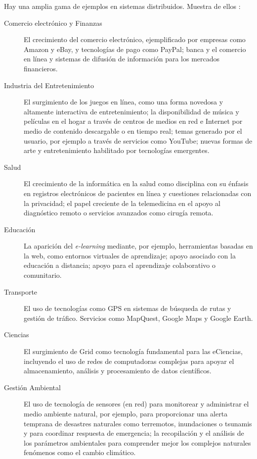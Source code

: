Hay una amplia gama de ejemplos en sistemas distribuidos. Muestra de ellos \cite{Coulouris2011}: 
\begin{description}
	\item[{Comercio electrónico y Finanzas}] 
	El crecimiento del comercio electrónico, ejemplificado por empresas como Amazon y eBay, y tecnologías de pago como PayPal;  banca y el comercio en línea y sistemas de difusión de información para los mercados financieros.
 	
	\item[{ Industria del Entretenimiento}]  
	El surgimiento de los juegos en línea,  como una forma novedosa y altamente interactiva de entretenimiento; la disponibilidad de música y películas en el hogar  a través de centros de medios en red e Internet por medio de contenido descargable o en tiempo real;  temas generado por el usuario, por ejemplo a través de servicios como YouTube; nuevas formas de arte y entretenimiento habilitado por tecnologías emergentes.
		
	\item[{Salud}]  
	El crecimiento de la informática en la salud  como disciplina con su énfasis en 	registros electrónicos de pacientes en l\'inea y cuestiones relacionadas con la privacidad; el papel creciente de la telemedicina en el apoyo al diagn\'ostico remoto o 	servicios avanzados como cirug\'ia remota.
		
	\item[{Educación}]  
	La aparici\'on del  \textit{e-learning}  mediante, por ejemplo, herramientas basadas en la web,	como entornos virtuales de aprendizaje; apoyo asociado con la educación a distancia; apoyo para el aprendizaje colaborativo o comunitario.
	
	\item[{Transporte}] El uso de tecnologías  como GPS en sistemas de búsqueda de rutas y gestión de tráfico. Servicios como MapQuest, Google Maps y Google Earth. 
	
	\item [{ Ciencias}] 
	El surgimiento de Grid como tecnología fundamental para las eCiencias, 	incluyendo el uso de  redes de computadoras complejas para apoyar el 	almacenamiento, análisis y procesamiento de datos científicos.
	
	\item[ { Gestión Ambiental }] El uso de tecnología de sensores (en red) para monitorear y administrar el medio ambiente natural, por ejemplo, para proporcionar una alerta temprana de desastres naturales como terremotos, inundaciones o tsunamis y para coordinar respuesta de emergencia; la recopilación y el análisis de los parámetros ambientales para comprender mejor los complejos naturales 	fenómenos como el cambio climático. 
			
\end{description}


